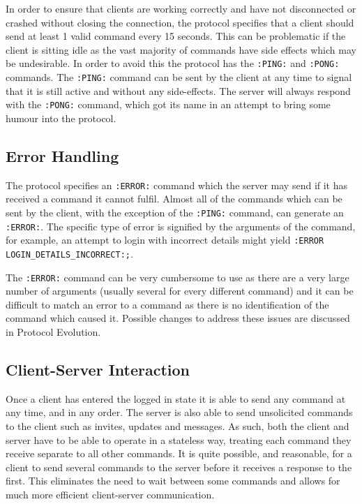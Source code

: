 In order to ensure that clients are working correctly and have not disconnected or crashed without closing the connection, the protocol specifies that a client should send at least 1 valid command every 15 seconds. This can be problematic if the client is sitting idle as the vast majority of commands have side effects which may be undesirable. In order to avoid this the protocol has the \texttt{:PING:} and \texttt{:PONG:} commands. The \texttt{:PING:} command can be sent by the client at any time to signal that it is still active and without any side-effects. The server will always respond with the \texttt{:PONG:} command, which got its name in an attempt to bring some humour into the protocol.

\subsection{Error Handling}

The protocol specifies an \texttt{:ERROR:} command which the server may send if it has received a command it cannot fulfil. Almost all of the commands which can be sent by the client, with the exception of the \texttt{:PING:} command, can generate an \texttt{:ERROR:}. The specific type of error is signified by the arguments of the command, for example, an attempt to login with incorrect details might yield \texttt{:ERROR LOGIN\_DETAILS\_INCORRECT:;}.

The \texttt{:ERROR:} command can be very cumbersome to use as there are a very large number of arguments (usually several for every different command) and it can be difficult to match an error to a command as there is no identification of the command which caused it. Possible changes to address these issues are discussed in Protocol Evolution.

\subsection{Client-Server Interaction}

Once a client has entered the logged in state it is able to send any command at any time, and in any order. The server is also able to send unsolicited commands to the client such as invites, updates and messages. As such, both the client and server have to be able to operate in a stateless way, treating each command they receive separate to all other commands. It is quite possible, and reasonable, for a client to send several commands to the server before it receives a response to the first. This eliminates the need to wait between some commands and allows for much more efficient client-server communication.

